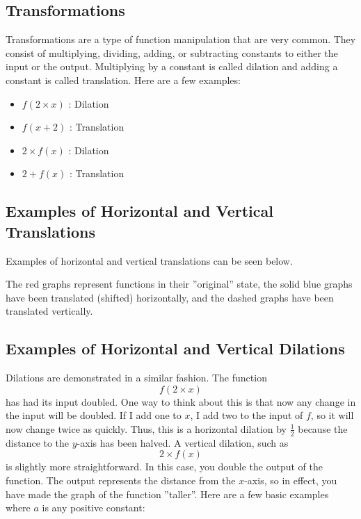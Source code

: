 \subsection{Transformations}
\label{sss:tran-dfc3}

Transformations are a type of function manipulation that are very common. They consist of
multiplying, dividing, adding, or subtracting constants to either the input or the output.
Multiplying by a constant is called dilation and adding a constant is called translation.
Here are a few examples:

\begin{itemize}
    \item $ f(2 \times x) $ :  Dilation
    \item $ f(x + 2) $ :  Translation
    \item $ 2 \times f(x) $ :  Dilation
    \item $ 2 + f(x) $ :  Translation
\end{itemize}

\subsection{Examples of Horizontal and Vertical Translations}
\label{sss:exam-30cf}

Examples of horizontal and vertical translations can be seen below.


The red graphs represent functions in their ''original'' state, the solid blue graphs have
been translated (shifted) horizontally, and the dashed graphs have been translated
vertically.

\subsection{Examples of Horizontal and Vertical Dilations}
\label{sss:exam-e155}


Dilations are demonstrated in a similar fashion. The function
\[
f(2 \times x)
\]
has had its input doubled. One way to think about this is that now any change in the input will be doubled. If I add one to $x$, I add two to the input of $f$, so it will now change twice as quickly. Thus, this is a horizontal dilation by $\frac{1}{2}$ because the distance to the $y$-axis has been halved. A vertical dilation, such as
\[
2 \times f(x)
\]
is slightly more straightforward. In this case, you double the output of the function. The output represents the distance from the $x$-axis, so in effect, you have made the graph of the function ''taller''. Here are a few basic examples where $a$ is any positive constant:

